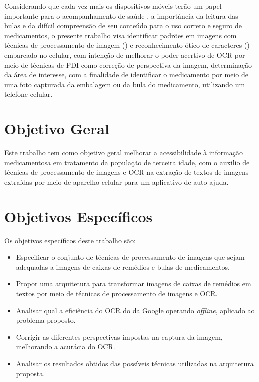 Considerando que cada vez mais os dispositivos móveis terão um papel importante para o acompanhamento de saúde \cite{ESTADAOCELULAR}, a importância da leitura das bulas e da difícil compreensão de seu conteúdo para o uso correto e seguro de medicamentos, o presente trabalho visa identificar padrões em imagens com técnicas de processamento de imagem () e reconhecimento ótico de caracteres () embarcado no celular, com intenção de melhorar o poder acertivo de OCR por meio de técnicas de PDI como correção de perspectiva da imagem, determinação da área de interesse, com a finalidade de identificar o medicamento por meio de uma foto capturada da embalagem ou da bula do medicamento, utilizando um telefone celular.





\section{Objetivo Geral}

Este trabalho tem como objetivo geral melhorar a acessibilidade à informação medicamentosa em tratamento da população de terceira idade, com o auxilio de técnicas de processamento de imagens e OCR na extração de textos de imagens extraídas por meio de aparelho celular para um aplicativo de auto ajuda.



\section{Objetivos Específicos}
Os objetivos específicos deste trabalho são: 
\begin{itemize}
    
    \item Especificar o conjunto de técnicas de processamento de imagens que sejam adequadas a imagens de caixas de remédios e bulas de medicamentos.
	\item Propor uma arquitetura para transformar imagens de caixas de remédios em textos por meio de técnicas de processamento de imagens e OCR.
	\item Analisar qual a eficiência do OCR do  da Google operando \textit{offline}, aplicado ao problema proposto.
	\item Corrigir as diferentes perspectivas impostas na captura da imagem, melhorando a acurácia do OCR.
	\item Analisar os resultados obtidos das possíveis técnicas utilizadas na arquitetura proposta.

\end{itemize}


